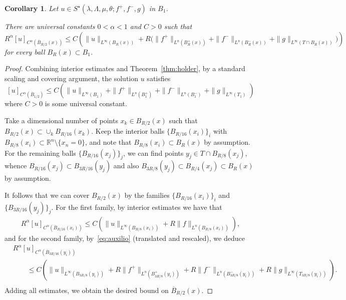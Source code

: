 \documentclass[letter,11pt]{amsart}
\newcommand{\R}{\mathbb{R}}
\newtheorem{cor}[thm]{Corollary}
\theoremstyle{definition}
\numberwithin{equation}{section}
\begin{document}
\begin{cor}
\label{cor:trueint}
Let $u \in S^{\star}(\lambda, \Lambda,\mu,\theta; f^{+}, f^{-}, g)$ in $B_1$.
 
There are universal constants $0 < \alpha < 1$ and $C >0$ such that
\[
R^{\alpha} [u]_{C^{\alpha}(\overline{B}_{R/2}(x))}
\leq 
C \left( \|u\|_{L^{\infty}(B_R(x))} 
+
R \Big(
 \|f^{+}\|_{L^n(B^{+}_R(x))} + \|f^{-}\|_{L^n(B^{-}_R(x))}
+ \|g\|_{L^{\infty}(T \cap B_R(x))}
\Big)
\right)
\]
for every ball $B_R(x) \subset B_1$.
\end{cor}
\begin{proof}
Combining interior estimates and Theorem~\ref{thm:holder}, by a standard scaling and covering argument, the solution $u$ satisfies
\begin{equation}
\label{eq:auxilio}
[u]_{C^{\alpha}(\overline{B}_{1/2})} \leq
C \left(
\|u\|_{L^{\infty}(B_1)} + \|f^{+}\|_{L^n(B^{+}_1)} + \|f^{-}\|_{L^n(B^{-}_1)}+ \|g\|_{L^{\infty}(T_1)}
\right)
\end{equation}
where $C > 0$ is some universal constant.

\medskip

Take a dimensional number of points $x_k \in B_{R/2}(x)$ such that 
$B_{R/2}(x) \subset \cup_k B_{R/16}(x_k)$.
Keep the interior balls $\{B_{R/16}(x_i)\}_{i}$ with 
$B_{R/8}(x_i)\subset \R^n \setminus \{x_n = 0\}$,
and note that $B_{R/8}(x_i) \subset B_{R}(x)$ by assumption.
For the remaining balls $\{B_{R/16}(x_j)\}_{j}$, 
we can find points $y_j \in T \cap B_{R/8}(x_j)$, whence $B_{R/16}(x_j) \subset B_{3R/16}(y_j)$ and also $B_{3R/8}(y_j) \subset B_{R/4}(x_j) \subset B_{R}(x)$ by assumption.

 \medskip

It follows that we can cover $B_{R/2}(x)$ by the families $\{B_{R/16}(x_i)\}_{i}$ and $\{B_{3R/16}(y_j)\}_{j}$.
For the first family, by interior estimates we have that
\[
\begin{split}
 R^{\alpha} [u]_{C^{\alpha}(\overline{B}_{R/16}(x_i))} \leq 
 C \left( \|u\|_{L^{\infty}(B_{R/8}(x_i))} + R \|f\|_{L^{n}(B_{R/8}(x_i))}\right),
\end{split}
\]
and for the second family, by~\eqref{eq:auxilio} (translated and rescaled), we deduce
\[
\begin{split}
&R^{\alpha} [u]_{C^{\alpha}(\overline{B}_{3R/16}(y_i))} \\
& \qquad \leq
C \left( \|u\|_{L^{\infty}(B_{3 R/8}(y_i))} 
+ R \|f^{+}\|_{L^{n}(B^{+}_{3R/8}(y_i))}
 + R \|f^{-}\|_{L^{n}(B^{-}_{3R/8}(y_i))}
 +  R\|g\|_{L^{\infty}(T_{3R/8}(y_i))}
\right).\\
\end{split}
\]
Adding all estimates, we obtain the desired bound on $\overline{B}_{R/2}(x)$.
\end{proof}
\end{document}
